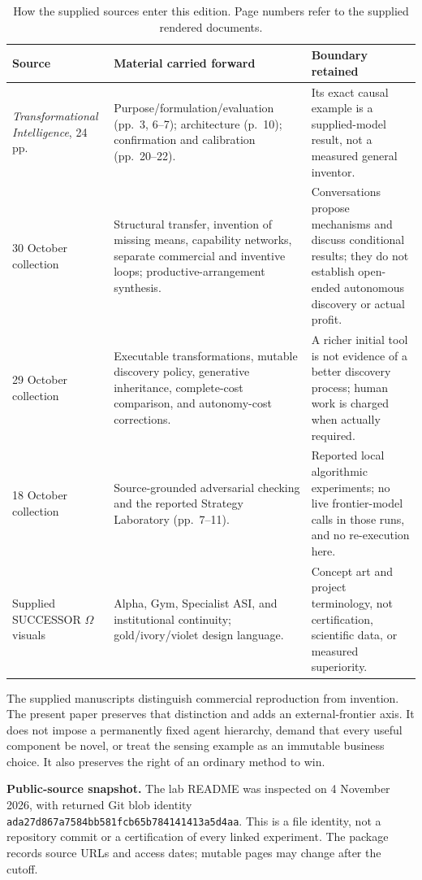 \documentclass[11pt,letterpaper]{article}
\theoremstyle{remark}\newtheorem{remark}{Remark}[section]
\begin{document}
\begin{table}[htbp]
\small
\caption{How the supplied sources enter this edition. Page numbers refer to the supplied rendered documents.}
\begin{tabularx}{\linewidth}{P{3.4cm}YY}
\toprule
\textbf{Source}&\textbf{Material carried forward}&\textbf{Boundary retained}\\\midrule
\emph{Transformational Intelligence}, 24 pp.&Purpose/formulation/evaluation (pp.~3, 6--7); architecture (p.~10); confirmation and calibration (pp.~20--22).&Its exact causal example is a supplied-model result, not a measured general inventor.\\
30 October collection \citep{notes30}&Structural transfer, invention of missing means, capability networks, separate commercial and inventive loops; productive-arrangement synthesis.&Conversations propose mechanisms and discuss conditional results; they do not establish open-ended autonomous discovery or actual profit.\\
29 October collection \citep{notes29}&Executable transformations, mutable discovery policy, generative inheritance, complete-cost comparison, and autonomy-cost corrections.&A richer initial tool is not evidence of a better discovery process; human work is charged when actually required.\\
18 October collection \citep{notes18}&Source-grounded adversarial checking and the reported Strategy Laboratory (pp.~7--11).&Reported local algorithmic experiments; no live frontier-model calls in those runs, and no re-execution here.\\
Supplied SUCCESSOR $\Omega$ visuals&Alpha, Gym, Specialist ASI, and institutional continuity; gold/ivory/violet design language.&Concept art and project terminology, not certification, scientific data, or measured superiority.\\\bottomrule
\end{tabularx}
\end{table}

The supplied manuscripts distinguish commercial reproduction from invention. The present paper preserves that distinction and adds an external-frontier axis. It does not impose a permanently fixed agent hierarchy, demand that every useful component be novel, or treat the sensing example as an immutable business choice. It also preserves the right of an ordinary method to win.

\textbf{Public-source snapshot.} The lab README was inspected on 4 November 2026, with returned Git blob identity \texttt{ada27d867a7584bb581fcb65b784141413a5d4aa}. This is a file identity, not a repository commit or a certification of every linked experiment. The package records source URLs and access dates; mutable pages may change after the cutoff.
\end{document}
